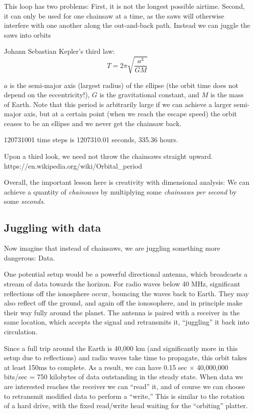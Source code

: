\documentclass[twocolumn]{article}
\begin{document}

This loop has two problems: First, it is not the longest possible airtime.
Second, it can only be used for one chainsaw at a time, as the saws will
otherwise interfere with one another along the out-and-back path.
Instead we can juggle the saws into orbits

Johann Sebastian Kepler's third law:
$$T = 2 \pi \sqrt{\frac{a^3}{GM}}$$

$a$ is the semi-major axis (largest radius) of the ellipse (the orbit time
does not depend on the eccentricity!), $G$ is the gravitational constant,
and $M$ is the mass of Earth. Note that this period is arbitrarily large
if we can achieve a larger semi-major axis, but at a certain point (when
we reach the escape speed) the orbit ceases to be an ellipse and we never
get the chainsaw back.

120731001 time steps is 1207310.01 seconds, 335.36 hours.


Upon a third look, we need not throw the chainsaws straight upward.
https://en.wikipedia.org/wiki/Orbital\_period

Overall, the important lesson here is creativity with dimensional
analysis: We can achieve a quantity of {\it chainsaws} by multiplying
some {\it chainsaws per second} by some {\it seconds}.

\subsection{Juggling with data}

Now imagine that instead of chainsaws, we are juggling something more
dangerous: Data.

One potential setup would be a powerful directional antenna, which
broadcasts a stream of data towards the horizon. For radio waves below
40 MHz, significant reflections off the ionosphere occur, bouncing the
waves back to Earth. They may also reflect off the ground, and again
off the ionosophere, and in principle make their way fully around the
planet. The antenna is paired with a receiver in the same location,
which accepts the signal and retransmits it, ``juggling'' it back into
circulation.

Since a full trip around the Earth is 40,000 km (and significantly
more in this setup due to reflections) and radio waves take time to
propagate, this orbit takes at least 150ms to
complete. As a result, we can have 0.15 sec $\times$ 40,000,000
bits/sec = 750 kilobytes of data outstanding in the steady state. When
data we are interested reaches the receiver we can ``read'' it, and of
course we can choose to retransmit modified data to perform a
``write,'' This is similar to the rotation of a hard drive, with the
fixed read/write head waiting for the ``orbiting'' platter.
\end{document}
